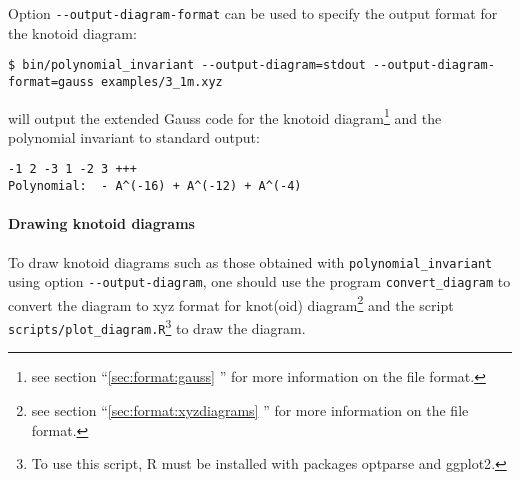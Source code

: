 Option \lstinline{--output-diagram-format} can be used to specify the output format for the knotoid diagram:
\begin{lstlisting}
$ bin/polynomial_invariant --output-diagram=stdout --output-diagram-format=gauss examples/3_1m.xyz
\end{lstlisting}
will output the extended Gauss code for the knotoid diagram\footnote{see section ``\ref{sec:format:gauss} '' for more information on the file format.} and the polynomial invariant to standard output:
\begin{lstlisting}
-1 2 -3 1 -2 3 +++
Polynomial:  - A^(-16) + A^(-12) + A^(-4)
\end{lstlisting}

\paragraph{Drawing knotoid diagrams}
To draw knotoid diagrams such as those obtained with \lstinline{polynomial_invariant} using option \lstinline{--output-diagram}, one should use the program \lstinline{convert_diagram} to convert the diagram to xyz format for knot(oid) diagram\footnote{see section ``\ref{sec:format:xyzdiagrams} '' for more information on the file format.} and the script \lstinline{scripts/plot_diagram.R}\footnote{To use this script, {\ttfamily R}\cite{r2017} must be installed with packages {\ttfamily optparse}\cite{optparse} and {\ttfamily ggplot2}\cite{wickham2009}.} to draw the diagram.


